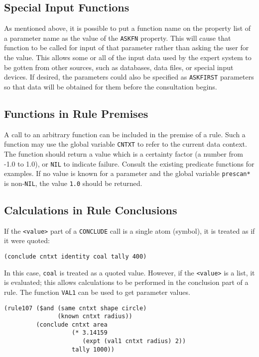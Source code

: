 \subsection{Special Input Functions}

As mentioned above, it is possible to put a function name on the
property list of a parameter name as the value of the {\tt ASKFN}
property.  This will cause that function to be called for input of
that parameter rather than asking the user for the value.  This allows
some or all of the input data used by the expert system to be gotten
from other sources, such as databases, data files, or special input
devices.  If desired, the parameters could also be specified as
{\tt ASKFIRST} parameters so that data will be obtained for them before the
consultation begins.

\subsection{Functions in Rule Premises}

A call to an arbitrary function can be included in the premise of a rule.
Such a function may use the global variable {\tt CNTXT} to refer to the current
data context.  The function should return a value which is a certainty factor
(a number from -1.0 to 1.0), or {\tt NIL} to indicate failure.  Consult the
existing predicate functions for examples.  If no value is known for a
parameter and the global variable {\tt *prescan*} is non-{\tt NIL}, the
value {\tt 1.0} should be returned.

\subsection{Calculations in Rule Conclusions}

If the {\tt <value>} part of a {\tt CONCLUDE} call is a single atom (symbol),
it is treated as if it were quoted:

\begin{verbatim}
(conclude cntxt identity coal tally 400)
\end{verbatim}

In this case, {\tt coal} is treated as a quoted value.  However, if the
{\tt <value>} is a list, it is evaluated; this allows calculations to be
performed in the conclusion part of a rule.  The function {\tt VAL1} can
be used to get parameter values.

\begin{verbatim}
(rule107 ($and (same cntxt shape circle)
               (known cntxt radius))
         (conclude cntxt area
                   (* 3.14159
                      (expt (val1 cntxt radius) 2))
                   tally 1000))
\end{verbatim}

